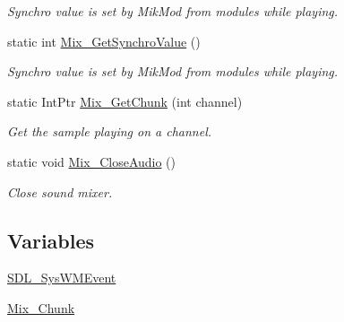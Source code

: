 \begin{DoxyCompactItemize}
\begin{DoxyCompactList}\small\item\em Synchro value is set by MikMod from modules while playing. \item\end{DoxyCompactList}\item 
static int \hyperlink{namespace_tao_1_1_sdl_a57d18f7c6158ed3aa5c0f142fe1b5a89}{Mix\_\-GetSynchroValue} ()
\begin{DoxyCompactList}\small\item\em Synchro value is set by MikMod from modules while playing. \item\end{DoxyCompactList}\item 
static IntPtr \hyperlink{namespace_tao_1_1_sdl_adc0cdaa130e049d17e52983ddddfbdae}{Mix\_\-GetChunk} (int channel)
\begin{DoxyCompactList}\small\item\em Get the sample playing on a channel. \item\end{DoxyCompactList}\item 
static void \hyperlink{namespace_tao_1_1_sdl_abec029152bd4c06ac9dd3ac6ca0efd21}{Mix\_\-CloseAudio} ()
\begin{DoxyCompactList}\small\item\em Close sound mixer. \item\end{DoxyCompactList}\end{DoxyCompactItemize}
\subsection*{Variables}
\begin{DoxyCompactItemize}
\item 
\hyperlink{namespace_tao_1_1_sdl_a316da039bbc7edf809d85badeaab6f23}{SDL\_\-SysWMEvent}
\item 
\hyperlink{namespace_tao_1_1_sdl_a9667e574282e6f26aa5247c7c93e1a77}{Mix\_\-Chunk}
\end{DoxyCompactItemize}


